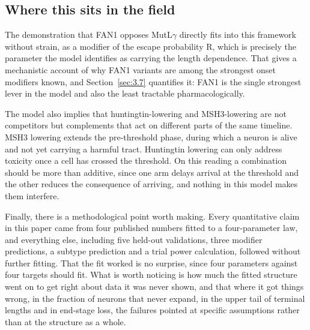 \documentclass[conference]{IEEEtran}
\begin{document}
\subsection{Where this sits in the field}
\label{sec:4.4}
The demonstration that FAN1 opposes MutL$\gamma$ directly \cite{senoussi} fits into this framework without strain, as a modifier of the escape probability R, which is precisely the parameter the model identifies as carrying the length dependence. That gives a mechanistic account of why FAN1 variants are among the strongest onset modifiers known, and Section~\ref{sec:3.7} quantifies it: FAN1 is the single strongest lever in the model and also the least tractable pharmacologically.

The model also implies that huntingtin-lowering and MSH3-lowering are not competitors but complements that act on different parts of the same timeline. MSH3 lowering extends the pre-threshold phase, during which a neuron is alive and not yet carrying a harmful tract. Huntingtin lowering can only address toxicity once a cell has crossed the threshold. On this reading a combination should be more than additive, since one arm delays arrival at the threshold and the other reduces the consequence of arriving, and nothing in this model makes them interfere.

Finally, there is a methodological point worth making. Every quantitative claim in this paper came from four published numbers fitted to a four-parameter law, and everything else, including five held-out validations, three modifier predictions, a subtype prediction and a trial power calculation, followed without further fitting. That the fit worked is no surprise, since four parameters against four targets should fit. What is worth noticing is how much the fitted structure went on to get right about data it was never shown, and that where it got things wrong, in the fraction of neurons that never expand, in the upper tail of terminal lengths and in end-stage loss, the failures pointed at specific assumptions rather than at the structure as a whole.
\end{document}
